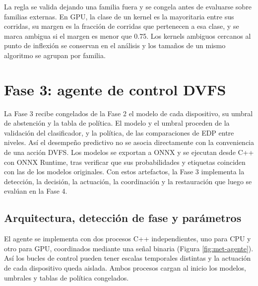 La regla se valida dejando una familia fuera y se congela antes de evaluarse sobre familias externas. En GPU, la clase de un kernel es la mayoritaria entre sus corridas, su margen es la fracción de corridas que pertenecen a esa clase, y se marca ambigua si el margen es menor que 0.75. Los kernels ambiguos cercanos al punto de inflexión se conservan en el análisis y los tamaños de un mismo algoritmo se agrupan por familia.

\section{Fase 3: agente de control DVFS}
\label{sec:metodologia-fase3}

La Fase 3 recibe congelados de la Fase 2 el modelo de cada dispositivo, su umbral de abstención y la tabla de política. El modelo y el umbral proceden de la validación del clasificador, y la política, de las comparaciones de EDP entre niveles. Así el desempeño predictivo no se asocia directamente con la conveniencia de una acción DVFS. Los modelos se exportan a ONNX y se ejecutan desde C++ con ONNX Runtime, tras verificar que sus probabilidades y etiquetas coinciden con las de los modelos originales. Con estos artefactos, la Fase 3 implementa la detección, la decisión, la actuación, la coordinación y la restauración que luego se evalúan en la Fase 4.

\subsection{Arquitectura, detección de fase y parámetros}
\label{sec:metodologia-agente-arquitectura}

El agente se implementa con dos procesos C++ independientes, uno para CPU y otro para GPU, coordinados mediante una señal binaria (Figura \ref{fig:met-agente}). Así los bucles de control pueden tener escalas temporales distintas y la actuación de cada dispositivo queda aislada. Ambos procesos cargan al inicio los modelos, umbrales y tablas de política congelados.

